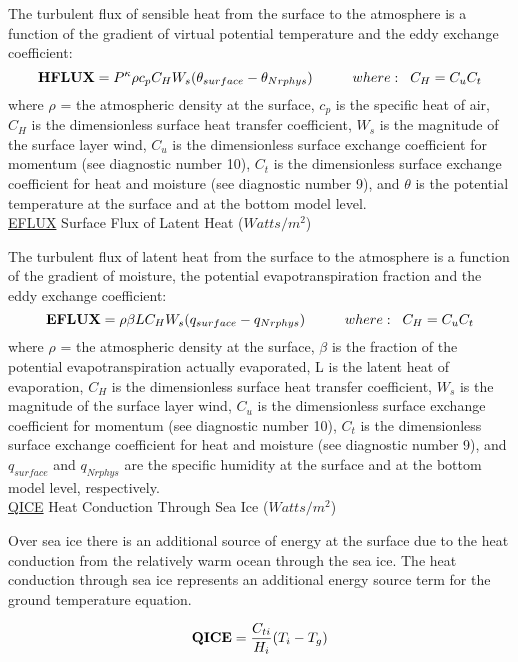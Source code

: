 The turbulent flux of sensible heat from the surface to the atmosphere is a function of the
gradient of virtual potential temperature and the eddy exchange coefficient:
\[
{\bf HFLUX} =  P^{\kappa}\rho c_{p} C_{H} W_s (\theta_{surface} - \theta_{Nrphys})
\hspace{1cm}where: \hspace{.2cm}C_H = C_u C_t
\]
where $\rho$ = the atmospheric density at the surface, $c_{p}$ is the specific
heat of air, $C_{H}$ is the dimensionless surface heat transfer coefficient, $W_s$ is the 
magnitude of the surface layer wind, $C_u$ is the dimensionless surface exchange coefficient 
for momentum (see diagnostic number 10), $C_t$ is the dimensionless surface exchange coefficient 
for heat and moisture (see diagnostic number 9), and $\theta$ is the potential temperature 
at the surface and at the bottom model level.
\\


{ \underline {EFLUX} Surface Flux of Latent Heat ($Watts/m^2$) } 

The turbulent flux of latent heat from the surface to the atmosphere is a function of the
gradient of moisture, the potential evapotranspiration fraction and the eddy exchange coefficient:
\[
{\bf EFLUX} =  \rho \beta L C_{H} W_s (q_{surface} - q_{Nrphys})
\hspace{1cm}where: \hspace{.2cm}C_H = C_u C_t
\]
where $\rho$ = the atmospheric density at the surface, $\beta$ is the fraction of
the potential evapotranspiration actually evaporated, L is the latent
heat of evaporation, $C_{H}$ is the dimensionless surface heat transfer coefficient, $W_s$ is the 
magnitude of the surface layer wind, $C_u$ is the dimensionless surface exchange coefficient 
for momentum (see diagnostic number 10), $C_t$ is the dimensionless surface exchange coefficient 
for heat and moisture (see diagnostic number 9), and $q_{surface}$ and $q_{Nrphys}$ are the specific
humidity at the surface and at the bottom model level, respectively.
\\

{ \underline {QICE} Heat Conduction Through Sea Ice ($Watts/m^2$) } 

Over sea ice there is an additional source of energy at the surface due to the heat
conduction from the relatively warm ocean through the sea ice. The heat conduction
through sea ice represents an additional energy source term for the ground temperature equation.

\[
{\bf QICE} = {C_{ti} \over {H_i}} (T_i-T_g)
\]

